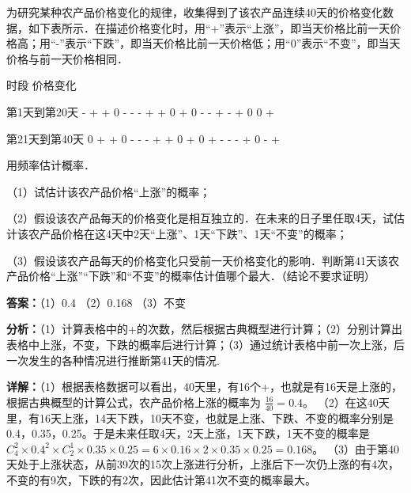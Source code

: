 \begin{question}[points=13]
为研究某种农产品价格变化的规律，收集得到了该农产品连续40天的价格变化数据，如下表所示．在描述价格变化时，用“+”表示“上涨”，即当天价格比前一天价格高；用“-”表示“下跌”，即当天价格比前一天价格低；用“0”表示“不变”，即当天价格与前一天价格相同．



时段                                                  价格变化



第1天到第20天     -  +  +  0  -  -  -  +  +  0  +  0  -  -  +  -  +  0  0  +



第21天到第40天     0  +  +  0  -  -  -  +  +  0  +  0  +  -  -  -  +  0  -  +



用频率估计概率．

（1）试估计该农产品价格“上涨”的概率；

（2）假设该农产品每天的价格变化是相互独立的．在未来的日子里任取4天，试估计该农产品价格在这4天中2天“上涨”、1天“下跌”、1天“不变”的概率；

（3）假设该农产品每天的价格变化只受前一天价格变化的影响．判断第41天该农产品价格“上涨”“下跌”和“不变”的概率估计值哪个最大．（结论不要求证明）
\begin{solution}
\textbf{答案：}（1）0.4 （2）0.168 （3）不变

\textbf{分析：}（1）计算表格中的+的次数，然后根据古典概型进行计算；（2）分别计算出表格中上涨，不变，下跌的概率后进行计算；（3）通过统计表格中前一次上涨，后一次发生的各种情况进行推断第41天的情况.

\textbf{详解：}（1）根据表格数据可以看出，40天里，有16个+，也就是有16天是上涨的，根据古典概型的计算公式，农产品价格上涨的概率为 $\frac{16}{40}=0.4$。
（2）在这40天里，有16天上涨，14天下跌，10天不变，也就是上涨、下跌、不变的概率分别是0.4，0.35，0.25。于是未来任取4天，2天上涨，1天下跌，1天不变的概率是 $C_4^2 \times 0.4^2 \times C_2^1 \times 0.35 \times 0.25 = 6 \times 0.16 \times 2 \times 0.35 \times 0.25 = 0.168$。
（3）由于第40天处于上涨状态，从前39次的15次上涨进行分析，上涨后下一次仍上涨的有4次，不变的有9次，下跌的有2次，因此估计第41次不变的概率最大。
\end{solution}
\end{question}

